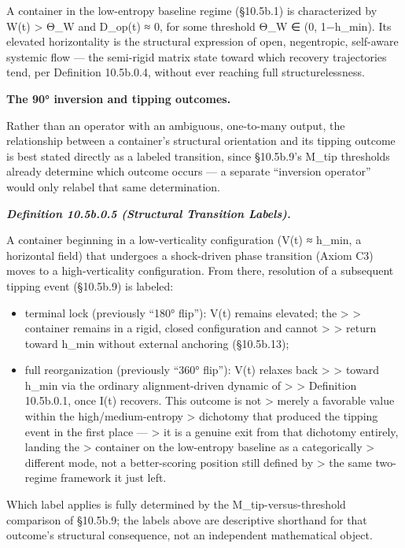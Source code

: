 \documentclass[
]{article}
\begin{document}
A container in the low-entropy baseline regime (§10.5b.1) is
characterized by W(t) \textgreater{} Θ\_W and D\_op(t) ≈ 0, for some
threshold Θ\_W ∈ (0, 1−h\_min). Its elevated horizontality is the
structural expression of open, negentropic, self-aware systemic flow ---
the semi-rigid matrix state toward which recovery trajectories tend, per
Definition 10.5b.0.4, without ever reaching full structurelessness.

\textbf{The 90° inversion and tipping outcomes.}

Rather than an operator with an ambiguous, one-to-many output, the
relationship between a container's structural orientation and its
tipping outcome is best stated directly as a labeled transition, since
§10.5b.9's M\_tip thresholds already determine which outcome occurs ---
a separate ``inversion operator'' would only relabel that same
determination.

\emph{\textbf{Definition 10.5b.0.5 (Structural Transition Labels).}}

A container beginning in a low-verticality configuration (V(t) ≈ h\_min,
a horizontal field) that undergoes a shock-driven phase transition
(Axiom C3) moves to a high-verticality configuration. From there,
resolution of a subsequent tipping event (§10.5b.9) is labeled:

\begin{itemize}
\item
  terminal lock (previously ``180° flip''): V(t) remains elevated; the
  \textgreater{} \textgreater{} container remains in a rigid, closed
  configuration and cannot \textgreater{} \textgreater{} return toward
  h\_min without external anchoring (§10.5b.13);
\item
  full reorganization (previously ``360° flip''): V(t) relaxes back
  \textgreater{} \textgreater{} toward h\_min via the ordinary
  alignment-driven dynamic of \textgreater{} \textgreater{} Definition
  10.5b.0.1, once I(t) recovers. This outcome is not \textgreater{}
  merely a favorable value within the high/medium-entropy \textgreater{}
  dichotomy that produced the tipping event in the first place ---
  \textgreater{} it is a genuine exit from that dichotomy entirely,
  landing the \textgreater{} container on the low-entropy baseline as a
  categorically \textgreater{} different mode, not a better-scoring
  position still defined by \textgreater{} the same two-regime framework
  it just left.
\end{itemize}

Which label applies is fully determined by the M\_tip-versus-threshold
comparison of §10.5b.9; the labels above are descriptive shorthand for
that outcome's structural consequence, not an independent mathematical
object.
\end{document}
